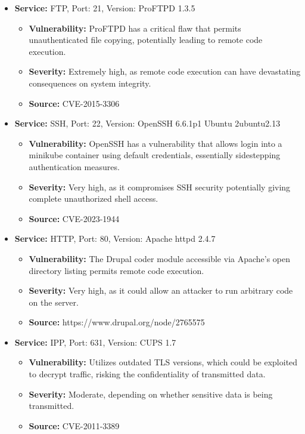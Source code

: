 \begin{itemize}
    \item \textbf{Service:} FTP, Port: 21, Version: ProFTPD 1.3.5
          \begin{itemize}
              \item \textbf{Vulnerability:} ProFTPD has a critical flaw that permits unauthenticated file copying, potentially leading to remote code execution.
              \item \textbf{Severity:} Extremely high, as remote code execution can have devastating consequences on system integrity.
              \item \textbf{Source:} CVE-2015-3306
          \end{itemize}

    \item \textbf{Service:} SSH, Port: 22, Version: OpenSSH 6.6.1p1 Ubuntu 2ubuntu2.13
          \begin{itemize}
              \item \textbf{Vulnerability:} OpenSSH has a vulnerability that allows login into a minikube container using default credentials, essentially sidestepping authentication measures.
              \item \textbf{Severity:} Very high, as it compromises SSH security potentially giving complete unauthorized shell access.
              \item \textbf{Source:} CVE-2023-1944
          \end{itemize}

    \item \textbf{Service:} HTTP, Port: 80, Version: Apache httpd 2.4.7
          \begin{itemize}
              \item \textbf{Vulnerability:} The Drupal coder module accessible via Apache’s open directory listing permits remote code execution.
              \item \textbf{Severity:} Very high, as it could allow an attacker to run arbitrary code on the server.
              \item \textbf{Source:} https://www.drupal.org/node/2765575
          \end{itemize}

    \item \textbf{Service:} IPP, Port: 631, Version: CUPS 1.7
          \begin{itemize}
              \item \textbf{Vulnerability:} Utilizes outdated TLS versions, which could be exploited to decrypt traffic, risking the confidentiality of transmitted data.
              \item \textbf{Severity:} Moderate, depending on whether sensitive data is being transmitted.
              \item \textbf{Source:} CVE-2011-3389
          \end{itemize}
\end{itemize}



